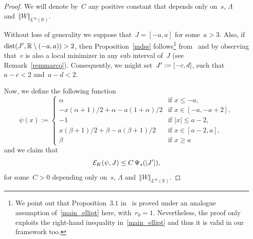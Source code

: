 \documentclass[10pt,a4paper]{amsart}
\numberwithin{equation}{section}
\newcommand{\R}{\mathbb{R}}
\newcommand{\Ec}{\mathcal{E}_K}
\begin{document}
\begin{proof}
We will denote by~$C$ any positive constant that depends only on~$s$, $\Lambda$ and~$\Vert W\Vert_{L^{\infty}(\R)}$.

Without loss of generality we suppose that~$J=[-a,a]$ for some~$a>3$. Also, if~${\rm dist}(J\rq{},\R\setminus(-a,a))>2$, then Proposition~\ref{mdss} follows\footnote{
We point out that Proposition~$3.1$ in~\cite{CozziValdNONLINEARITY} is proved under an analogue assumption of~\eqref{main_ellipt} here, with~$r_0=1$. Nevertheless, the proof only exploits the right-hand inequality in~\eqref{main_ellipt} and thus it is valid in our framework too.
} from~\cite[Proposition 3.1]{CozziValdNONLINEARITY} and by observing that~$v$ is also a local minimizer in any sub interval of~$J$ (see Remark~\ref{remmarco}). Consequently, we might set~$J\rq{}:=[-c,d]$, such that~$a-c<2$ and~$a-d<2$.

Now, we define the following function
\begin{equation*}\psi(x):=
\begin{cases}
\alpha &\mbox{if } x \leq -a, \\
-x(\alpha+1)/2 +\alpha-a(1+\alpha)/2 &\mbox{if } x \in [-a, -a+2],\\
-1 & \mbox{if }   |x | \leq a-2, \\
x (\beta+1)/2 +\beta-a(\beta+1)/2 &\mbox{if } x \in [a-2, a],\\
\beta  &\mbox{if } x \geq a
\end{cases}
\end{equation*}
and we claim that
\begin{equation}\label{cheinerp}
\Ec(\psi,  J ) \leq C \,\Psi_s(|J\rq{}|),
\end{equation}
for some~$C>0$ depending only on~$s$, $\Lambda$ and~$\Vert W \Vert_{L^{\infty}(\R)}$.


\end{proof}
\end{document}
